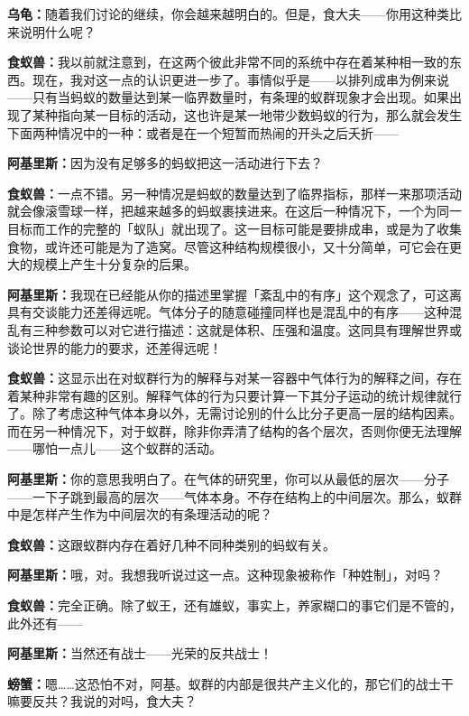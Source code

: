 \documentclass[
  12pt,
  twoside,
  openright,
  oldfontcommands,
]{memoir}
\newcommand{\dialogname}[1]{{\heifamily\bfseries #1}}
\begin{document}
\dialogname{乌龟：}随着我们讨论的继续，你会越来越明白的。但是，食大夫------你用这种类比来说明什么呢？

\dialogname{食蚁兽：}我以前就注意到，在这两个彼此非常不同的系统中存在着某种相一致的东西。现在，我对这一点的认识更进一步了。事情似乎是------以排列成串为例来说------只有当蚂蚁的数量达到某一临界数量时，有条理的蚁群现象才会出现。如果出现了某种指向某一目标的活动，这也许是某一地带少数蚂蚁的行为，那么就会发生下面两种情况中的一种：或者是在一个短暂而热闹的开头之后夭折------

\dialogname{阿基里斯：}因为没有足够多的蚂蚁把这一活动进行下去？

\dialogname{食蚁兽：}一点不错。另一种情况是蚂蚁的数量达到了临界指标，那样一来那项活动就会像滚雪球一样，把越来越多的蚂蚁裹挟进来。在这后一种情况下，一个为同一目标而工作的完整的「蚁队」就出现了。这一目标可能是要排成串，或是为了收集食物，或许还可能是为了造窝。尽管这种结构规模很小，又十分简单，可它会在更大的规模上产生十分复杂的后果。

\dialogname{阿基里斯：}我现在已经能从你的描述里掌握「紊乱中的有序」这个观念了，可这离具有交谈能力还差得远呢。气体分子的随意碰撞同样也是混乱中的有序------这种混乱有三种参数可以对它进行描述：这就是体积、压强和温度。这同具有理解世界或谈论世界的能力的要求，还差得远呢！

\dialogname{食蚁兽：}这显示出在对蚁群行为的解释与对某一容器中气体行为的解释之间，存在着某种非常有趣的区别。解释气体的行为只要计算一下其分子运动的统计规律就行了。除了考虑这种气体本身以外，无需讨论别的什么比分子更高一层的结构因素。而在另一种情况下，对于蚁群，除非你弄清了结构的各个层次，否则你便无法理解------哪怕一点儿------这个蚁群的活动。

\dialogname{阿基里斯：}你的意思我明白了。在气体的研究里，你可以从最低的层次------分子------一下子跳到最高的层次------气体本身。不存在结构上的中间层次。那么，蚁群中是怎样产生作为中间层次的有条理活动的呢？

\dialogname{食蚁兽：}这跟蚁群内存在着好几种不同种类别的蚂蚁有关。

\dialogname{阿基里斯：}哦，对。我想我听说过这一点。这种现象被称作「种姓制」，对吗？

\dialogname{食蚁兽：}完全正确。除了蚁王，还有雄蚁，事实上，养家糊口的事它们是不管的，此外还有------

\dialogname{阿基里斯：}当然还有战士------光荣的反共战士！

\dialogname{螃蟹：}嗯\ldots\ldots 这恐怕不对，阿基。蚁群的内部是很共产主义化的，那它们的战士干嘛要反共？我说的对吗，食大夫？
\end{document}
